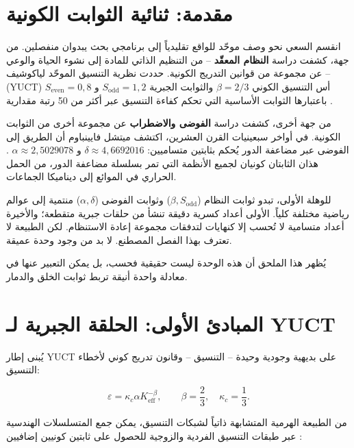 \documentclass[12pt,a4paper]{article}
\begin{document}
	\tableofcontents
	\newpage
	
	\section{مقدمة: ثنائية الثوابت الكونية}
	
	انقسم السعي نحو وصف موحّد للواقع تقليدياً إلى برنامجي بحث يبدوان منفصلين. من جهة، كشفت دراسة \textbf{النظام المعقّد} – من التنظيم الذاتي للمادة إلى نشوء الحياة والوعي – عن مجموعة من قوانين التدريج الكونية. حددت نظرية التنسيق الموحّد لياكوشيف (YUCT) أس التنسيق الكوني \(\beta = 2/3\) والثوابت الجبرية \(S_{\mathrm{odd}} = 1{,}2\) و \(S_{\mathrm{even}} = 0{,}8\) باعتبارها الثوابت الأساسية التي تحكم كفاءة التنسيق عبر أكثر من 50 رتبة مقدارية \cite{Yakushev2026, AppendixAF}.
	
	من جهة أخرى، كشفت دراسة \textbf{الفوضى والاضطراب} عن مجموعة أخرى من الثوابت الكونية. في أواخر سبعينيات القرن العشرين، اكتشف ميتشل فايينباوم أن الطريق إلى الفوضى عبر مضاعفة الدور يُحكم بثابتين متساميين: \(\delta \approx 4{,}6692016\) و \(\alpha \approx 2{,}5029078\) \cite{Feigenbaum1978}. هذان الثابتان كونيان لجميع الأنظمة التي تمر بسلسلة مضاعفة الدور، من الحمل الحراري في الموائع إلى ديناميكا الجماعات.
	
	للوهلة الأولى، تبدو ثوابت النظام (\(\beta, S_{\mathrm{odd}}\)) وثوابت الفوضى (\(\alpha, \delta\)) منتمية إلى عوالم رياضية مختلفة كلياً. الأولى أعداد كسرية دقيقة تنشأ من حلقات جبرية متقطعة؛ والأخيرة أعداد متسامية لا تُحسب إلا كنهايات لتدفقات مجموعة إعادة الاستنظام. لكن الطبيعة لا تعترف بهذا الفصل المصطنع. لا بد من وجود وحدة عميقة.
	
	يُظهر هذا الملحق أن هذه الوحدة ليست حقيقية فحسب، بل يمكن التعبير عنها في معادلة واحدة أنيقة تربط ثوابت الخلق والدمار.
	
	\section{المبادئ الأولى: الحلقة الجبرية لـ YUCT}
	
	يُبنى إطار YUCT على بديهية وجودية وحيدة – التنسيق – وقانون تدريج كوني لأخطاء التنسيق:
	
	\begin{equation}
		\varepsilon = \kappa_c \alpha K_{\mathrm{eff}}^{-\beta}, \qquad \beta = \frac{2}{3}, \quad \kappa_c = \frac{1}{3}.
	\end{equation}
	
	من الطبيعة الهرمية المتشابهة ذاتياً لشبكات التنسيق، يمكن جمع المتسلسلات الهندسية عبر طبقات التنسيق الفردية والزوجية للحصول على ثابتين كونيين إضافيين \cite{AppendixFerra}:
	
\end{document}
